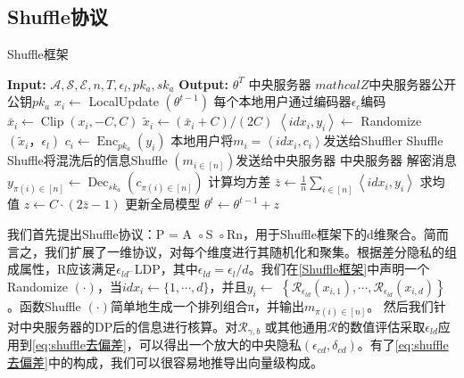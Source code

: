 \subsection{Shuffle协议}
\begin{algorithm}[!htb]
  \caption{Shuffle框架}
  \label{Shuffle框架}
  \begin{algorithmic}[1]
    \footnotesize
    \STATE \textbf{Input:} $\mathcal{A},\mathcal{S},\mathcal{E},n,T,\epsilon_{l},p k_{a},s k_{a}$
    \STATE \textbf{Output:} $\theta^{T}$
      \STATE 中央服务器 $mathcal{Z}$中央服务器公开公钥$p k_{a}$
          \STATE $x_{i} \leftarrow$ LocalUpdate $\left(\theta^{t-1}\right)$
          \STATE 每个本地用户通过编码器$\epsilon_{c}$编码
          \STATE $\bar{x}_{i} \leftarrow \operatorname{Clip}\left(x_{i},-C,C\right)$
          \STATE $\tilde{x}_{i} \leftarrow\left(\bar{x}_{i}+C\right) /(2 C)$
          \STATE $\left\langle i d x_{i},y_{i}\right\rangle \leftarrow$ Randomize $\left(\tilde{x}_{i}， \epsilon_{l}\right)$
          \STATE $c_{i} \leftarrow \operatorname{Enc}_{p k_{a}}\left(y_{i}\right)$
          \STATE 本地用户将$m_{i}=\left\langle i d x_{i},c_{i}\right\rangle$发送给Shuffler
        \ENDFOR
      \STATE Shuffle
      \STATE Shuffle将混洗后的信息Shuffle $\left(m_{i \in[n]}\right)$发送给中央服务器
      \STATE 中央服务器
      \STATE 解密消息 $y_{\pi(i) \in[n]} \leftarrow \operatorname{Dec}_{s k_{a}}\left(c_{\pi(i) \in[n]}\right)$
      \STATE 计算均方差 $\bar{z} \leftarrow \frac{1}{n} \sum_{i \in[n]}\left\langle i d x_{i},y_{i}\right\rangle$
      \STATE 求均值 $z \leftarrow C \cdot(2 \bar{z}-1)$
      \STATE 更新全局模型 $\theta^{t} \leftarrow \theta^{t-1}+z$
  \end{algorithmic}
\end{algorithm}

我们首先提出Shuffle协议：P = A ◦S ◦Rn，用于Shuffle框架下的d维聚合。简而言之，我们扩展了一维协议，对每个维度进行其随机化和聚集。根据差分隐私的组成属性，R应该满足$\epsilon_{l d^{-}}$LDP，其中$\epsilon_{l d}=\epsilon_{l} / d$。我们在\ref{Shuffle框架}中声明一个Randomize $(\cdot)$，当$i d x_{i} \leftarrow\{1, \cdots, d\}$，并且$y_{i} \leftarrow$ $\left\{\mathcal{R}_{\epsilon_{l d}}\left(x_{i, 1}\right), \cdots, \mathcal{R}_{\epsilon_{l d}}\left(x_{i, d}\right)\right\}$。函数Shuffle $(\cdot)$简单地生成一个排列组合π，并输出$m_{\pi(i) \in[n]}$。
然后我们针对中央服务器的DP后的信息进行核算。对$\mathcal{R}_{\gamma, b}$ 或其他通用$\mathcal{R}$的数值评估采取$\epsilon_{l d}$应用到\ref{eq:shuffle去偏差}，可以得出一个放大的中央隐私$\left(\epsilon_{c d}, \delta_{c d}\right)$。有了\ref{eq:shuffle去偏差}中的构成，我们可以很容易地推导出向量级构成。

